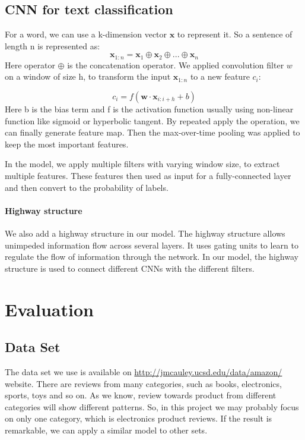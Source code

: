 \documentclass[11pt]{article}
\begin{document}
\subsection{CNN for text classification}
For a word, we can use a k-dimension vector \(\bm{x}\) to represent it. So a sentence of length n is represented as:
\[\mathbf{x}_{1:n} = \bm{x}_1 \oplus \bm{x}_2 \oplus ... \oplus \bm{x}_n\]
Here operator \(\oplus\) is the concatenation operator. We applied convolution filter \(w\) on a window of size h, to transform the input \(\mathbf{x}_{1:n}\) to a new feature \(c_i\):

\[c_i = f(\mathbf{w}\cdot\mathbf{x}_{i:i+h} + b ) \]
 Here b is the bias term and f is the activation function usually using non-linear function like sigmoid or hyperbolic tangent. By repeated apply the operation, we can finally generate feature map. Then the max-over-time pooling was applied to keep the most important features.
 
In the model, we apply multiple filters with varying window size, to extract multiple features\cite{kim2014cnntext}. These features then used as input for a fully-connected layer and then convert to the probability of labels.\\

\paragraph{Highway structure} We also add a highway structure \cite{srivastava2015highway} in our model. The highway structure allows unimpeded information flow across several layers. It uses gating units to learn to regulate the flow of information through the network. In our model, the highway structure is used to connect different CNNs with the different filters.

\section{Evaluation}

\subsection{Data Set}

The data set we use is available on \url{http://jmcauley.ucsd.edu/data/amazon/} website. There are reviews from many categories, such as books, electronics, sports, toys and so on. As we know, review towards product from different categories will show different patterns. So, in this project we may probably focus on only one category, which is electronics product reviews. If the result is remarkable, we can apply a similar model to other sets. 
\end{document}

